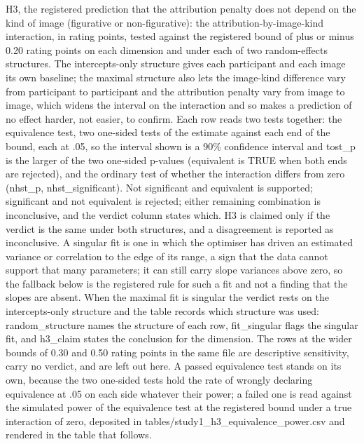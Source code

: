 \begin{table}[!h]
\centering
\caption{\label{tab:supp_h3_equivalence}H3, the registered prediction that the attribution penalty does not depend on the kind of image (figurative or non-figurative): the attribution-by-image-kind interaction, in rating points, tested against the registered bound of plus or minus 0.20 rating points on each dimension and under each of two random-effects structures. The intercepts-only structure gives each participant and each image its own baseline; the maximal structure also lets the image-kind difference vary from participant to participant and the attribution penalty vary from image to image, which widens the interval on the interaction and so makes a prediction of no effect harder, not easier, to confirm. Each row reads two tests together: the equivalence test, two one-sided tests of the estimate against each end of the bound, each at .05, so the interval shown is a 90\% confidence interval and tost\_p is the larger of the two one-sided p-values (equivalent is TRUE when both ends are rejected), and the ordinary test of whether the interaction differs from zero (nhst\_p, nhst\_significant). Not significant and equivalent is supported; significant and not equivalent is rejected; either remaining combination is inconclusive, and the verdict column states which. H3 is claimed only if the verdict is the same under both structures, and a disagreement is reported as inconclusive. A singular fit is one in which the optimiser has driven an estimated variance or correlation to the edge of its range, a sign that the data cannot support that many parameters; it can still carry slope variances above zero, so the fallback below is the registered rule for such a fit and not a finding that the slopes are absent. When the maximal fit is singular the verdict rests on the intercepts-only structure and the table records which structure was used: random\_structure names the structure of each row, fit\_singular flags the singular fit, and h3\_claim states the conclusion for the dimension. The rows at the wider bounds of 0.30 and 0.50 rating points in the same file are descriptive sensitivity, carry no verdict, and are left out here. A passed equivalence test stands on its own, because the two one-sided tests hold the rate of wrongly declaring equivalence at .05 on each side whatever their power; a failed one is read against the simulated power of the equivalence test at the registered bound under a true interaction of zero, deposited in tables/study1\_h3\_equivalence\_power.csv and rendered in the table that follows.}

\end{table}
